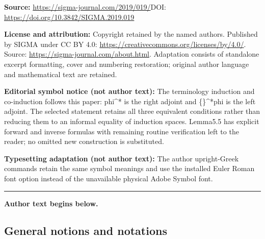 \documentclass[11pt]{article}
\numberwithin{equation}{section}
\begin{document}
\noindent\textbf{Source:} \url{https://sigma-journal.com/2019/019/}\quad DOI: \url{https://doi.org/10.3842/SIGMA.2019.019}\par
\noindent\textbf{License and attribution:} Copyright retained by the named authors. Published by SIGMA under CC BY 4.0: \url{https://creativecommons.org/licenses/by/4.0/}. Source: \url{https://sigma-journal.com/about.html}. Adaptation consists of standalone excerpt formatting, cover and numbering restoration; original author language and mathematical text are retained.\par
\noindent\textbf{Editorial symbol notice (not author text):} The terminology induction and co-induction follows this paper: phi\textasciicircum{}* is the right adjoint and \{\}\textasciicircum{}*phi is the left adjoint. The selected statement retains all three equivalent conditions rather than reducing them to an informal equality of induction spaces. Lemma5.5 has explicit forward and inverse formulas with remaining routine verification left to the reader; no omitted new construction is substituted.\par
\noindent\textbf{Typesetting adaptation (not author text):} The author upright-Greek commands retain the same symbol meanings and use the installed Euler Roman font option instead of the unavailable physical Adobe Symbol font.\par
\medskip\hrule\medskip\noindent\textbf{Author text begins below.}\par
\setcounter{section}{0}
\setcounter{subsection}{0}
\setcounter{subsubsection}{0}
\setcounter{Theorem}{0}
\setcounter{equation}{0}
\newcommand{\rJoin}{\rtimes}
\newcommand{\lJoin}{\ltimes}


\setcounter{section}{1}
\setcounter{subsection}{1}
\setcounter{subsubsection}{0}
\setcounter{Theorem}{0}
\setcounter{equation}{0}
\subsection{General notions and notations}\label{ssec:notation}
\end{document}

